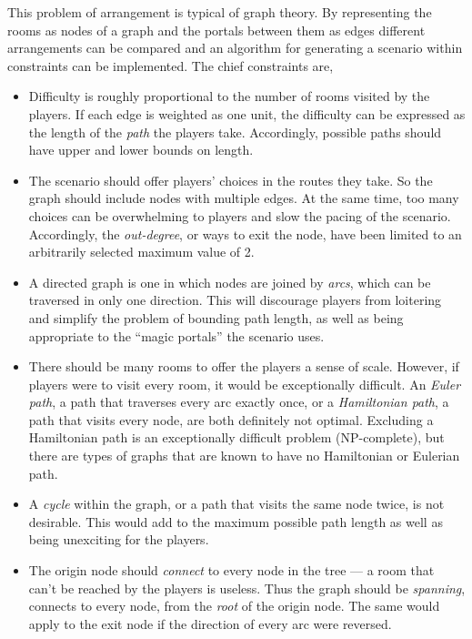 \documentclass[landscape, a0, final]{a0poster}
\begin{document}
\begin{minipage}{0.25\linewidth}
\begin{minipage}{0.9\linewidth}
This problem of arrangement is typical of graph theory.  By representing the rooms as nodes of a graph and the portals between them as edges different arrangements can be compared and an algorithm for generating a scenario within constraints can be implemented.  The chief constraints are, 
    \begin{itemize} 
        \item Difficulty is roughly proportional to the number of rooms visited by the players.  If each edge is weighted as one unit, the difficulty can be expressed as the length of the \emph{path} the players take.  Accordingly, possible paths should have upper and lower bounds on length.
        \item The scenario should offer players' choices in the routes they take.  So the graph should include nodes with multiple edges.  At the same time, too many choices can be overwhelming to players and slow the pacing of the scenario.  Accordingly, the \emph{out-degree}, or ways to exit the node, have been limited to an arbitrarily selected maximum value of 2.
        \item A directed graph is one in which nodes are joined by \emph{arcs}, which can be traversed in only one direction.  This will discourage players from loitering and simplify the problem of bounding path length, as well as being appropriate to the ``magic portals'' the scenario uses.
        \item There should be many rooms to offer the players a sense of scale.  However, if players were to visit every room, it would be exceptionally difficult.  An \emph{Euler path}, a path that traverses every arc exactly once, or a \emph{Hamiltonian path}, a path that visits every node, are both definitely not optimal.  Excluding a Hamiltonian path is an exceptionally difficult problem (NP-complete), but there are types of graphs that are known to have no Hamiltonian or Eulerian path.
        \item A \emph{cycle} within the graph, or a path that visits the same node twice, is not desirable.  This would add to the maximum possible path length as well as being unexciting for the players.
        \item The origin node should \emph{connect} to every node in the tree --- a room that can't be reached by the players is useless.  Thus the graph should be \emph{spanning}, connects to every node, from the \emph{root} of the origin node.  The same would apply to the exit node if the direction of every arc were reversed.
\end{itemize} 




\end{minipage} %
\end{minipage} %
\end{document}
